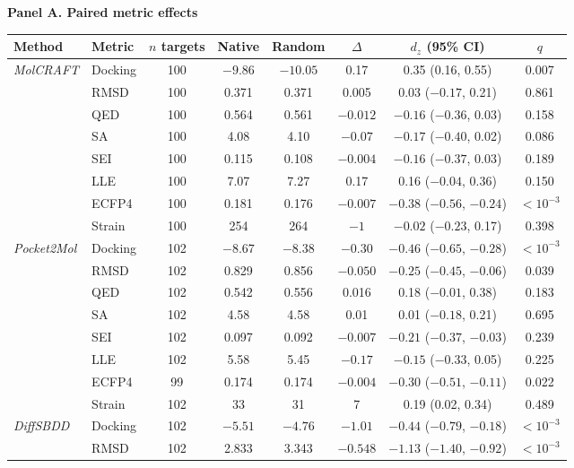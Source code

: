 \begin{samepage}
\textbf{Panel A. Paired metric effects}
\begin{center}\scriptsize
\setlength{\tabcolsep}{2pt}
\begin{tabular}{@{}llcccccc@{}}
\toprule
\textbf{Method} & \textbf{Metric} & \textbf{$n$ targets} & \textbf{Native} & \textbf{Random} & \textbf{$\Delta$} & \textbf{$d_z$ (95\% CI)} & \textbf{$q$} \\
\midrule
\textit{MolCRAFT} & Docking & 100 & $-9.86$ & $-10.05$ & 0.17 & 0.35 (0.16, 0.55) & 0.007 \\
 & RMSD & 100 & 0.371 & 0.371 & 0.005 & 0.03 ($-0.17$, 0.21) & 0.861 \\
 & QED & 100 & 0.564 & 0.561 & $-0.012$ & $-0.16$ ($-0.36$, 0.03) & 0.158 \\
 & SA & 100 & 4.08 & 4.10 & $-0.07$ & $-0.17$ ($-0.40$, 0.02) & 0.086 \\
 & SEI & 100 & 0.115 & 0.108 & $-0.004$ & $-0.16$ ($-0.37$, 0.03) & 0.189 \\
 & LLE & 100 & 7.07 & 7.27 & 0.17 & 0.16 ($-0.04$, 0.36) & 0.150 \\
 & ECFP4 & 100 & 0.181 & 0.176 & $-0.007$ & $-0.38$ ($-0.56$, $-0.24$) & $<10^{-3}$ \\
 & Strain & 100 & 254 & 264 & $-1$ & $-0.02$ ($-0.23$, 0.17) & 0.398 \\
\midrule
\textit{Pocket2Mol} & Docking & 102 & $-8.67$ & $-8.38$ & $-0.30$ & $-0.46$ ($-0.65$, $-0.28$) & $<10^{-3}$ \\
 & RMSD & 102 & 0.829 & 0.856 & $-0.050$ & $-0.25$ ($-0.45$, $-0.06$) & 0.039 \\
 & QED & 102 & 0.542 & 0.556 & 0.016 & 0.18 ($-0.01$, 0.38) & 0.183 \\
 & SA & 102 & 4.58 & 4.58 & 0.01 & 0.01 ($-0.18$, 0.21) & 0.695 \\
 & SEI & 102 & 0.097 & 0.092 & $-0.007$ & $-0.21$ ($-0.37$, $-0.03$) & 0.239 \\
 & LLE & 102 & 5.58 & 5.45 & $-0.17$ & $-0.15$ ($-0.33$, 0.05) & 0.225 \\
 & ECFP4 & 99 & 0.174 & 0.174 & $-0.004$ & $-0.30$ ($-0.51$, $-0.11$) & 0.022 \\
 & Strain & 102 & 33 & 31 & 7 & 0.19 (0.02, 0.34) & 0.489 \\
\midrule
\textit{DiffSBDD} & Docking & 102 & $-5.51$ & $-4.76$ & $-1.01$ & $-0.44$ ($-0.79$, $-0.18$) & $<10^{-3}$ \\
 & RMSD & 102 & 2.833 & 3.343 & $-0.548$ & $-1.13$ ($-1.40$, $-0.92$) & $<10^{-3}$ \\

\end{tabular}
\end{center}
\end{samepage}
